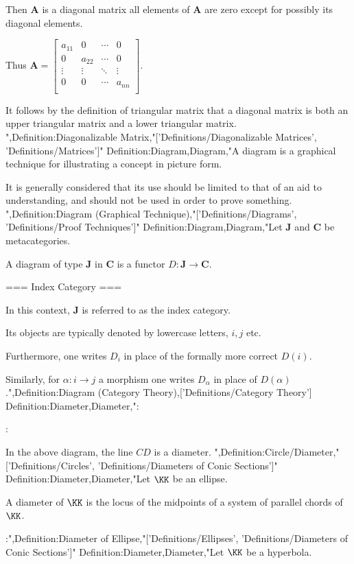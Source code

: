 Then $\mathbf A$ is a diagonal matrix  all elements of $\mathbf A$ are zero except for possibly its diagonal elements.


Thus $\mathbf A = \begin{bmatrix}
a_{11} & 0 & \cdots & 0 \\
0 & a_{22} & \cdots & 0 \\
\vdots & \vdots & \ddots & \vdots \\
0 & 0 & \cdots & a_{nn} \\
\end{bmatrix}$.


It follows by the definition of triangular matrix that a diagonal matrix is both an upper triangular matrix and a lower triangular matrix.
",Definition:Diagonalizable Matrix,"['Definitions/Diagonalizable Matrices', 'Definitions/Matrices']"
Definition:Diagram,Diagram,"A diagram is a graphical technique for illustrating a concept in picture form.

It is generally considered that its use should be limited to that of an aid to understanding, and should not be used in order to prove something.
",Definition:Diagram (Graphical Technique),"['Definitions/Diagrams', 'Definitions/Proof Techniques']"
Definition:Diagram,Diagram,"Let $\mathbf J$ and $\mathbf C$ be metacategories.


A diagram of type $\mathbf J$ in $\mathbf C$ is a functor $D: \mathbf J \to \mathbf C$.


=== Index Category ===

In this context, $\mathbf J$ is referred to as the index category.

Its objects are typically denoted by lowercase letters, $i, j$ etc.


Furthermore, one writes $D_i$ in place of the formally more correct $D \left({i}\right)$.

Similarly, for $\alpha: i \to j$ a morphism one writes $D_\alpha$ in place of $D \left({\alpha}\right)$.",Definition:Diagram (Category Theory),['Definitions/Category Theory']
Definition:Diameter,Diameter,":


:


In the above diagram, the line $CD$ is a diameter.
",Definition:Circle/Diameter,"['Definitions/Circles', 'Definitions/Diameters of Conic Sections']"
Definition:Diameter,Diameter,"Let $\KK$ be an ellipse.

A diameter of $\KK$ is the locus of the midpoints of a system of parallel chords of $\KK$.


:",Definition:Diameter of Ellipse,"['Definitions/Ellipses', 'Definitions/Diameters of Conic Sections']"
Definition:Diameter,Diameter,"Let $\KK$ be a hyperbola.

